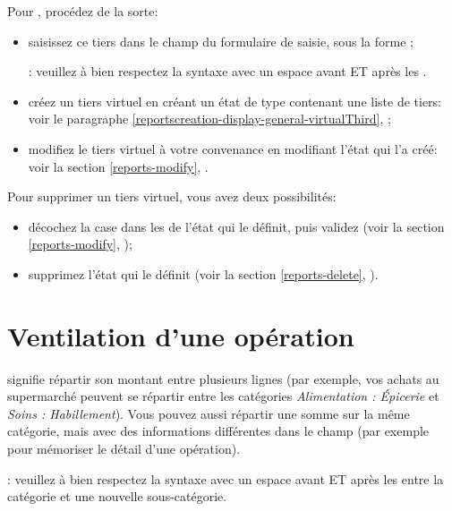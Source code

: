 Pour , procédez de la sorte:
\begin{itemize}
	\item saisissez ce tiers dans le champ  du formulaire de saisie, sous la forme ;
	
	\Note{}: veuillez à bien respectez la syntaxe avec un espace avant ET après les \frquote{:}.
	\item créez un tiers virtuel en créant un état de type  contenant une liste de tiers: voir le paragraphe \vref{reportscreation-display-general-virtualThird}, ;
	\item modifiez le tiers virtuel à votre convenance en modifiant l'état qui l'a créé: voir la section \vref{reports-modify}, .
\end{itemize}

Pour supprimer un tiers virtuel, vous avez deux possibilités:
\begin{itemize}
	\item décochez la case  dans les  de l'état qui le définit, puis validez (voir la section \vref{reports-modify}, );
	\item supprimez l'état qui le définit (voir la section \vref{reports-delete}, ).
\end{itemize}


\section{Ventilation d'une opération\label{transactions-breakdown}}

 signifie répartir son montant entre plusieurs lignes (par exemple, vos achats au supermarché peuvent se répartir entre les catégories \emph{Alimentation : Épicerie} et \emph{Soins : Habillement}). Vous pouvez aussi répartir une somme sur la même catégorie, mais avec des informations différentes dans le champ  (par exemple pour mémoriser le détail d'une opération).

\Note{}: veuillez à bien respectez la syntaxe avec un espace avant ET après les \frquote{:} entre la catégorie et une nouvelle sous-catégorie.


